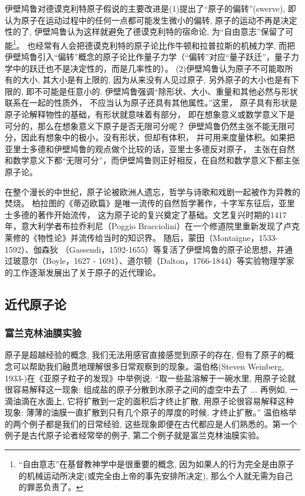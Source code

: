 伊壁鸠鲁对德谟克利特原子假说的主要改进是(1)提出了“原子的偏转”(swerve),
即认为原子在运动过程中的任何一点都可能发生微小的偏转,
原子的运动不再是决定性的了,
伊壁鸠鲁认为这样就避免了德谟克利特的宿命论,
为“自由意志”保留了可能\footnote{“自由意志”在基督教神学中是很重要的概念,
因为如果人的行为完全是由原子的机械运动所决定(或完全由上帝的事先安排所决定),
那么个人就无需为自己的罪恶负责了。}。
也经常有人会把德谟克利特的原子论比作牛顿和拉普拉斯的机械力学,
而把伊壁鸠鲁引入“偏转”概念的原子论比作量子力学（“偏转”对应“量子跃迁”，量子力学中的跃迁也不是决定性的，而是几率性的）。
(2)伊壁鸠鲁认为原子不可能取所有的大小, 其大小是有上限的,
因为从来没有人见过原子, 另外原子的大小也是有下限的,
即不可能是任意小的.
伊壁鸠鲁强调“除形状、大小、重量和其他必然与形状联系在一起的性质外，
不应当认为原子还具有其他属性。”这里，
原子具有形状是原子论解释物性的基础，有形状就意味着有部分，
即在想象意义或数学意义下是可分的，那么在想象意义下原子是否无限可分呢？
伊壁鸠鲁仍然主张不能无限可分，因此有想象中的极小，没有形状，但却有体积，
并可用来度量体积。如果把亚里士多德和伊壁鸠鲁的观点做个比较的话，亚里士多德反对原子，
主张在自然和数学意义下都“无限可分”，而伊壁鸠鲁则正好相反，在自然和数学意义下都主张原子论。


在整个漫长的中世纪，原子论被欧洲人遗忘，哲学与诗歌和戏剧一起被作为异教的焚烧。
柏拉图的《蒂迈欧篇》是唯一流传的自然哲学著作，十字军东征后，亚里士多德的著作开始流传，
这为原子论的复兴奠定了基础。文艺复兴时期的1417年，意大利学者布拉乔利尼（Poggio
Bracciolini）在一个修道院里重新发现了卢克莱修的《物性论》并流传给当时的知识界。
随后，蒙田（Montaigne，1533-1592）、伽森狄
（Gassendi，1592-1655）等复活了伊壁鸠鲁的原子论思想，并通过玻意尔（Boyle，1627
-
1691）、道尔顿（Dalton，1766-1844）等实验物理学家的工作逐渐发展出了关于原子的近代理论。

\subsection{近代原子论}

\subsubsection{富兰克林油膜实验}

原子是超越经验的概念, 我们无法用感官直接感觉到原子的存在,
但有了原子的概念可以帮助我们融贯地理解很多日常观察到的现象。温伯格(Steven
Weinberg, 1933-)在《亚原子粒子的发现》中举例说:
“取一些盐溶解于一碗水里, 用原子论就很容易解释这一现象:
组成盐的原子分散到水原子之间的虚空中去了 ... 再例如,
一滴油滴在水面上, 它将扩散到一定的面积后才终止扩散,
用原子论很容易解释这种现象:
薄薄的油膜一直扩散到只有几个原子的厚度的时候, 才终止扩散。”
温伯格举的两个例子都是我们的日常经验,
这些现象即便在古代都应是人们熟悉的。第一个例子是古代原子论者经常举的例子,
第二个例子就是富兰克林油膜实验。

